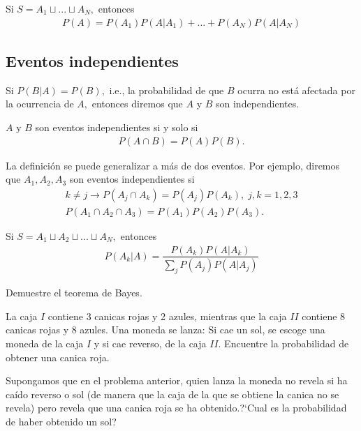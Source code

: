 {}
\begin{thm}
	\label{thm:1.10} Si $S=A_{1}\sqcup ... \sqcup A_{N},$  entonces
	\begin{align}
		\label{1.20}
		P(A)=P(A_{1})P(A|A_{1})+...+P(A_{N})P(A|A_{N})
	\end{align}
\end{thm}


\subsection{Eventos independientes}
{}
Si $P(B|A)=P(B),$ i.e., la probabilidad de que $B$ ocurra no está afectada por la ocurrencia de $A,$ entonces diremos que $A$ y $B$ son independientes.


\begin{defn}
	$A$ y $B$ son eventos independientes si y solo si
	\begin{align}
		\label{1.21}
		P(A \cap B) = P(A)P(B).
	\end{align}
\end{defn}


{}
La definición se puede generalizar a más de dos eventos.  Por ejemplo, diremos que $A_{1},A_{2},A_{3}$ son eventos independientes si
\begin{align}
	k\neq j \rightarrow P(A_{j} \cap A_{k})=P(A_{j})P(A_{k}), \; j,k=1,2,3 
	\\ P(A_{1}\cap A_{2} \cap A_{3})=P(A_{1})P(A_{2})P(A_{3}).
\end{align}


{}
\begin{thm}
	Si $S=A_{1}\sqcup A_{2} \sqcup...\sqcup A_{N},$ entonces
	\begin{align}
		\label{1.24}
		P(A_{k}|A) = \dfrac{P(A_{k})P(A|A_{k})}{\sum_{j} P(A_{j})P(A|A_{j})}
	\end{align}
	
\end{thm}




\begin{ejemplo}
	\label{solved:1.16}
	Demuestre el teorema de Bayes.
\end{ejemplo}



{}
\begin{ejemplo}
	\label{solved:1.15}
	La caja $I$ contiene 3 canicas rojas y 2 azules, mientras que la caja $II$ contiene $8$ canicas rojas y 8 azules. Una moneda se lanza: Si cae un sol, se escoge una moneda de la caja $I$ y si cae reverso, de la caja $II.$ Encuentre la probabilidad de obtener una canica roja.
\end{ejemplo}


{}
\begin{ejemplo}
	\label{solved:17}
	Supongamos que en el problema anterior, quien lanza la moneda no revela si ha caído reverso o sol (de manera que la caja de la que se obtiene la canica no se revela) pero revela que una canica roja se ha obtenido.?`Cual es la probabilidad de haber obtenido un sol?
\end{ejemplo}


